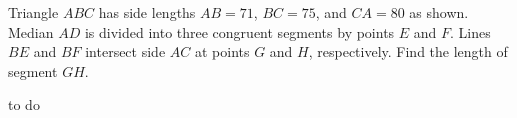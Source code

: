 Triangle ${ABC}$ has side lengths ${AB}=71$, ${BC}=75$, and ${CA}=80$ as shown. Median $AD$ is divided into three congruent segments by points $E$ and $F$. Lines ${BE}$ and ${BF}$ intersect side ${AC}$ at points $G$ and $H$, respectively. Find the length of segment ${GH}$.

\begin{answer}
to do
\end{answer}
